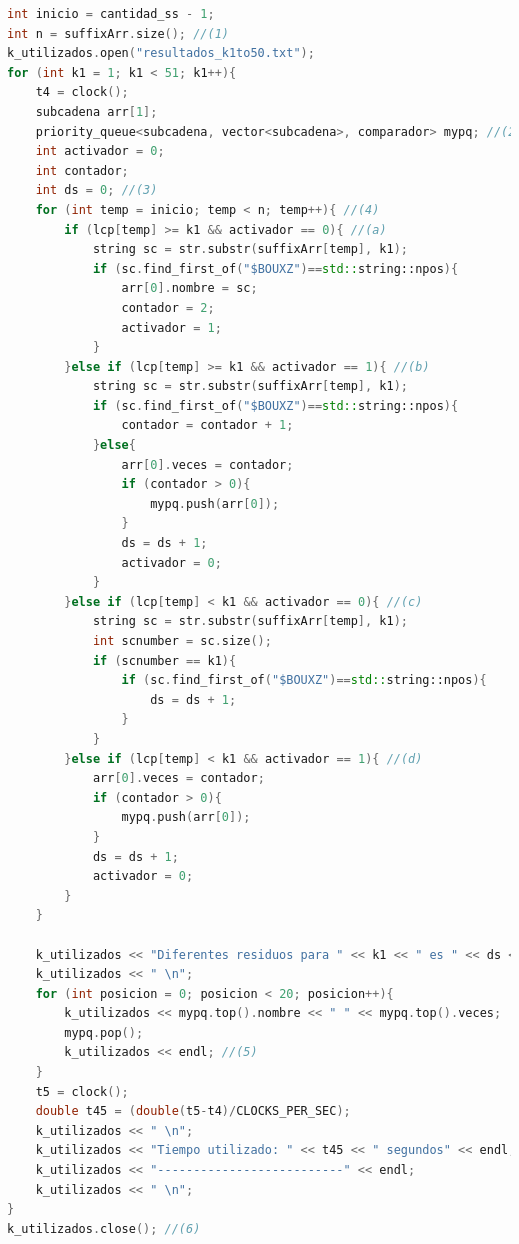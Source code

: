 \begin{lstlisting}[language=C++, caption=Obtención de los diferentes substrings de largo $k$ y los 20 substrings que más se repiten para la cadena de proteínas]
int inicio = cantidad_ss - 1;
int n = suffixArr.size(); //(1)
k_utilizados.open("resultados_k1to50.txt");
for (int k1 = 1; k1 < 51; k1++){
    t4 = clock();
    subcadena arr[1];
    priority_queue<subcadena, vector<subcadena>, comparador> mypq; //(2)
    int activador = 0;
    int contador;
    int ds = 0; //(3)
    for (int temp = inicio; temp < n; temp++){ //(4)
        if (lcp[temp] >= k1 && activador == 0){ //(a)
            string sc = str.substr(suffixArr[temp], k1);
            if (sc.find_first_of("$BOUXZ")==std::string::npos){
                arr[0].nombre = sc;
                contador = 2;
                activador = 1;
            }
        }else if (lcp[temp] >= k1 && activador == 1){ //(b)
            string sc = str.substr(suffixArr[temp], k1);
            if (sc.find_first_of("$BOUXZ")==std::string::npos){
                contador = contador + 1;
            }else{
                arr[0].veces = contador;
                if (contador > 0){
                    mypq.push(arr[0]);
                }
                ds = ds + 1;
                activador = 0;
            }
        }else if (lcp[temp] < k1 && activador == 0){ //(c)
            string sc = str.substr(suffixArr[temp], k1);
            int scnumber = sc.size();
            if (scnumber == k1){
                if (sc.find_first_of("$BOUXZ")==std::string::npos){
                    ds = ds + 1;
                }
            }
        }else if (lcp[temp] < k1 && activador == 1){ //(d)
            arr[0].veces = contador;
            if (contador > 0){
                mypq.push(arr[0]);
            }
            ds = ds + 1;
            activador = 0;
        }
    }

    k_utilizados << "Diferentes residuos para " << k1 << " es " << ds << endl;
    k_utilizados << " \n";
    for (int posicion = 0; posicion < 20; posicion++){
        k_utilizados << mypq.top().nombre << " " << mypq.top().veces;
        mypq.pop();
        k_utilizados << endl; //(5)
    }
    t5 = clock();
    double t45 = (double(t5-t4)/CLOCKS_PER_SEC);
    k_utilizados << " \n"; 
    k_utilizados << "Tiempo utilizado: " << t45 << " segundos" << endl;
    k_utilizados << "--------------------------" << endl;
    k_utilizados << " \n";
}
k_utilizados.close(); //(6)
	
\end{lstlisting}

